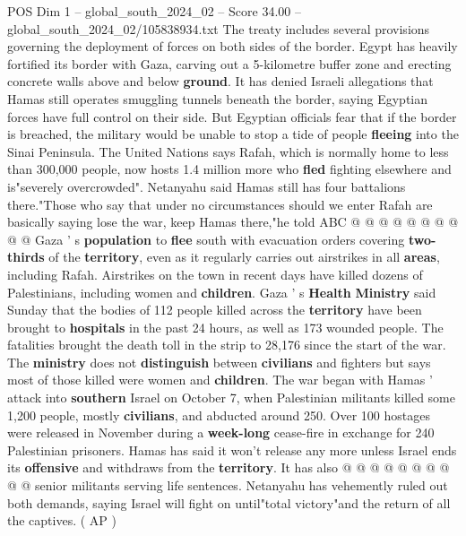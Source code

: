 \begin{textsample}{POS Dim 1 – global\_south\_2024\_02 – Score 34.00 – global\_south\_2024\_02/105838934.txt}
The treaty includes several provisions governing the deployment of forces on both sides of the border.
Egypt has heavily fortified its border with Gaza, carving out a 5-kilometre buffer zone and erecting concrete walls above and below \textbf{ground}.
It has denied Israeli allegations that Hamas still operates smuggling tunnels beneath the border, saying Egyptian forces have full control on their side.
But Egyptian officials fear that if the border is breached, the military would be unable to stop a tide of people \textbf{fleeing} into the Sinai Peninsula.
The United Nations says Rafah, which is normally home to less than 300,000 people, now hosts 1.4 million more who \textbf{fled} fighting elsewhere and is"severely overcrowded".
Netanyahu said Hamas still has four battalions there."Those who say that under no circumstances should we enter Rafah are basically saying lose the war, keep Hamas there,"he told ABC @ @ @ @ @ @ @ @ @ @ Gaza ' s \textbf{population} to \textbf{flee} south with evacuation orders covering \textbf{two-thirds} of the \textbf{territory}, even as it regularly carries out airstrikes in all \textbf{areas}, including Rafah.
Airstrikes on the town in recent days have killed dozens of Palestinians, including women and \textbf{children}.
Gaza ' s \textbf{Health} \textbf{Ministry} said Sunday that the bodies of 112 people killed across the \textbf{territory} have been brought to \textbf{hospitals} in the past 24 hours, as well as 173 wounded people.
The fatalities brought the death toll in the strip to 28,176 since the start of the war.
The \textbf{ministry} does not \textbf{distinguish} between \textbf{civilians} and fighters but says most of those killed were women and \textbf{children}.
The war began with Hamas ' attack into \textbf{southern} Israel on October 7, when Palestinian militants killed some 1,200 people, mostly \textbf{civilians}, and abducted around 250.
Over 100 hostages were released in November during a \textbf{week-long} cease-fire in exchange for 240 Palestinian prisoners.
Hamas has said it won't release any more unless Israel ends its \textbf{offensive} and withdraws from the \textbf{territory}.
It has also @ @ @ @ @ @ @ @ @ @ senior militants serving life sentences.
Netanyahu has vehemently ruled out both demands, saying Israel will fight on until"total victory"and the return of all the captives. ( AP )

\end{textsample}
